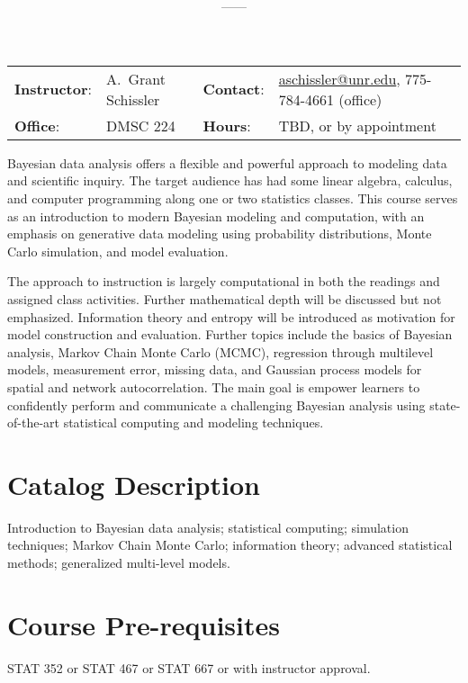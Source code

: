 \documentclass[11pt,onecolumn]{article}
\title{\textbf{\coursename}}
\author{{\semester}---{\roomnumb}---{\classtimes}}
\date{}
\makeatletter
\newcommand{\myname}{A.~Grant Schissler}
\newcommand{\myemail}{aschissler@unr.edu}
\newcommand{\office}{DMSC 224}
\newcommand{\officehours}{TBD, or by appointment}
\makeatother
\begin{document}
\maketitle

\noindent\makebox[\linewidth]{\rule{\textwidth}{1pt}}

\begin{center}
\begin{tabular}{llll}
\textbf{Instructor}:&\myname & \textbf{Contact}:&\href{mailto:\myemail}{\myemail}, 775-784-4661 (office)\\
\textbf{Office}:&\office & \textbf{Hours}:&\officehours\\
\end{tabular}
\end{center}

Bayesian data analysis offers a flexible and powerful approach to modeling data and scientific inquiry. The target audience has had some linear algebra, calculus, and computer programming along one or two statistics classes. This course serves as an introduction to modern Bayesian modeling and computation, with an emphasis on generative data modeling using probability distributions, Monte Carlo simulation, and model evaluation.

The approach to instruction is largely computational in both the readings and assigned class activities. Further mathematical depth will be discussed but not emphasized. Information theory and entropy will be introduced as motivation for model construction and evaluation. Further topics include the basics of Bayesian analysis, Markov Chain Monte Carlo (MCMC), regression through multilevel models, measurement error, missing data, and Gaussian process models for spatial and network autocorrelation. The main goal is empower learners to confidently perform and communicate a challenging Bayesian analysis using state-of-the-art statistical computing and modeling techniques. 

\section*{Catalog Description}
Introduction to Bayesian data analysis; statistical computing; simulation techniques; Markov Chain Monte Carlo; information theory; advanced statistical methods; generalized multi-level models.

\section*{Course Pre-requisites}
STAT 352 or STAT 467 or STAT 667 or with instructor approval.
\end{document}

